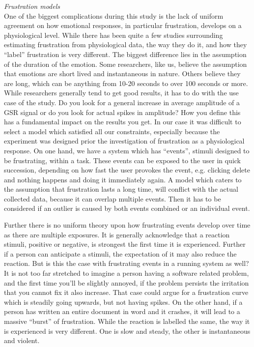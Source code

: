 \textit{Frustration models}\\
One of the biggest complications during this study is the lack of uniform agreement on how emotional responses, in particular frustration, develops on a physiological level. While there has been quite a few studies surrounding estimating frustration from physiological data, the way they do it, and how they ``label'' frustration is very different.
The biggest difference lies in the assumption of the duration of the emotion. 
Some researchers, like us, believe the assumption that emotions are short lived and instantaneous in nature. 
Others believe they are long, which can be anything from 10-20 seconds to over 100 seconds or more. 
While researchers generally tend to get good results, it has to do with the use case of the study. 
Do you look for a general increase in average amplitude of a GSR signal or do you look for actual spikes in amplitude? 
How you define this has a fundamental impact on the results you get. 
In our case it was difficult to select a model which satisfied all our constraints, especially because the experiment was designed prior the investigation of frustration as a physiological response. 
On one hand, we have a system which has ``events'', stimuli designed to be frustrating, within a task. These events can be exposed to the user in quick succession, depending on how fast the user provokes the event, e.g. clicking delete and nothing happens and doing it immediately again. 
A model which caters to the assumption that frustration lasts a long time, will conflict with the actual collected data, because it can overlap multiple events. Then it has to be considered if an outlier is caused by both events combined or an individual event. 

Further there is no uniform theory upon how frustrating events develop over time as there are multiple exposures. It is generally acknowledge that a reaction stimuli, positive or negative, is strongest the first time it is experienced. Further if a person can anticipate a stimuli, the expectation of it may also reduce the reaction. But is this the case with frustrating events in a running system as well? It is not too far stretched to imagine a person having a software related problem, and the first time you'll be slightly annoyed, if the problem persists the irritation that you cannot fix it also increase. That case could argue for a frustration curve which is steadily going upwards, but not having spikes.
On the other hand, if a person has written an entire document in word and it crashes, it will lead to a massive ``burst'' of frustration. 
While the reaction is labelled the same, the way it is experienced is very different. One is slow and steady, the other is instantaneous and violent.

